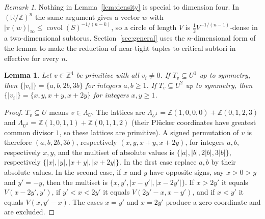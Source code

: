 \documentclass[12pt]{amsart}
\newtheorem{lemma}[theorem]{Lemma}
\theoremstyle{definition}\newtheorem{definition}[theorem]{Definition}
\theoremstyle{remark}\newtheorem{remark}[theorem]{Remark}
\newcommand{\Z}{\mathbb Z}\newcommand{\R}{\mathbb R}\newcommand{\T}{\mathbb T}
\newcommand{\covol}{\operatorname{covol}}
\newcommand{\supn}[1]{\lvert #1\rvert_\infty}
\newcommand{\Uone}{U^{1}}\newcommand{\Utwo}{U^{2}}
\begin{document}
\begin{remark}\label{rem:generaln}
Nothing in Lemma~\ref{lem:density} is special to dimension four. In $(\R/\Z)^n$ the same argument gives a vector $w$ with $\supn{\pi(w)}\le\covol(S)^{-1/(n-k)}$, so a circle of length $V$ is $\frac12V^{-1/(n-1)}$-dense in a two-dimensional subtorus. Section~\ref{sec:general} uses the $n$-dimensional form of the lemma to make the reduction of near-tight tuples to critical subtori in \cite[Lemma~2.4]{Cordella} effective for every $n$.
\end{remark}

\begin{lemma}\label{lem:families}
Let $v\in\Z^4$ be primitive with all $v_i\ne0$. If $T_v\subseteq\Uone$ up to symmetry, then $\{|v_i|\}=\{a,b,2b,3b\}$ for integers $a,b\ge 1$. If $T_v\subseteq\Utwo$ up to symmetry, then $\{|v_i|\}=\{x,y,x+y,x+2y\}$ for integers $x,y\ge 1$.
\end{lemma}
\begin{proof}
$T_v\subseteq U$ means $v\in\Lambda_U$. The lattices are $\Lambda_{\Uone}=\Z(1,0,0,0)+\Z(0,1,2,3)$ and $\Lambda_{\Utwo}=\Z(1,0,1,1)+\Z(0,1,1,2)$ (their Pl\"ucker coordinates have greatest common divisor $1$, so these lattices are primitive). A signed permutation of $v$ is therefore $(a,b,2b,3b)$, respectively $(x,y,x+y,x+2y)$, for integers $a,b$, respectively $x,y$, and the multiset of absolute values is $\{|a|,|b|,2|b|,3|b|\}$, respectively $\{|x|,|y|,|x+y|,|x+2y|\}$. In the first case replace $a,b$ by their absolute values. In the second case, if $x$ and $y$ have opposite signs, say $x>0>y$ and $y'=-y$, then the multiset is $\{x,y',|x-y'|,|x-2y'|\}$. If $x>2y'$ it equals $V(x-2y',y')$, if $y'<x<2y'$ it equals $V(2y'-x,x-y')$, and if $x<y'$ it equals $V(x,y'-x)$. The cases $x=y'$ and $x=2y'$ produce a zero coordinate and are excluded.
\end{proof}
\end{document}

